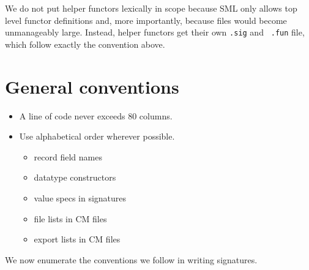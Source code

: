 \documentclass[12pt]{article}
\begin{document}
We do not put helper functors lexically in scope because SML only allows top
level functor definitions and, more importantly, because files would become
unmanageably large.  Instead, helper functors get their own {\tt .sig} and {\tt
.fun} file, which follow exactly the convention above.

\section{General conventions}

\begin{itemize}
\item A line of code never exceeds 80 columns.
\item Use alphabetical order wherever possible.
\begin{itemize}
\item record field names
\item datatype constructors
\item value specs in signatures
\item file lists in CM files
\item export lists in CM files
\end{itemize}
\end{itemize}



We now enumerate the conventions we follow in writing signatures.
\end{document}
